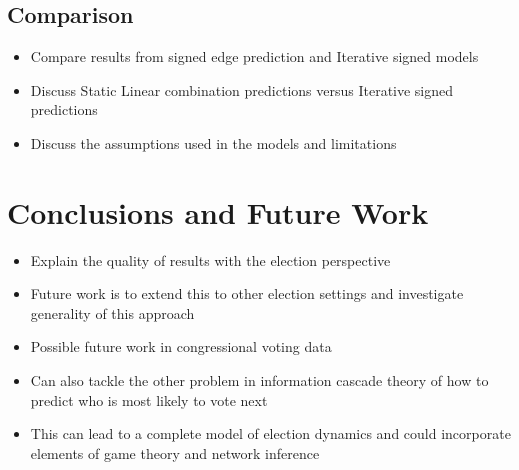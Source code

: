 \section{Comparison}
\begin{itemize}
    \item Compare results from signed edge prediction and Iterative signed models
    \item Discuss Static Linear combination predictions versus Iterative signed predictions 
    \item Discuss the assumptions used in the models and limitations 
\end{itemize}

\chapter{Conclusions and Future Work}
\label{chp:conclusion}
\begin{itemize}
    \item Explain the quality of results with the election perspective
    \item Future work is to extend this to other election settings and investigate generality of this approach
    \item Possible future work in congressional voting data
    \item Can also tackle the other problem in information cascade theory of how to predict who is most likely to vote next 
    \item This can lead to a complete model of election dynamics and could incorporate elements of game theory and network inference 
\end{itemize}
